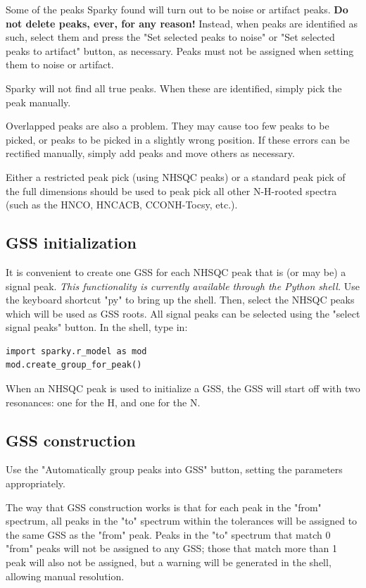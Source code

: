 Some of the peaks Sparky found will turn out to be noise or artifact peaks.
\textbf{Do not delete peaks, ever, for any reason!}  Instead,
when peaks are identified as such, select them and press the "Set selected 
peaks to noise" or "Set selected peaks to artifact" button, as necessary.
Peaks must not be assigned when setting them to noise or artifact.

Sparky will not find all true peaks.  When these are identified, simply
pick the peak manually.

Overlapped peaks are also a problem.  They may cause too few peaks to be 
picked, or peaks to be picked in a slightly wrong position.  If these errors
can be rectified manually, simply add peaks and move others as necessary.

Either a restricted peak pick (using NHSQC peaks) or a standard peak pick
of the full dimensions should be used to peak pick all other N-H-rooted
spectra (such as the HNCO, HNCACB, CCONH-Tocsy, etc.).

\subsection{GSS initialization}
It is convenient to create one GSS for each NHSQC peak that is (or may be)
a signal peak.  \textit{This functionality is currently available through
the Python shell.}  Use the keyboard shortcut "py" to bring up the shell.
Then, select the NHSQC peaks which will be used as GSS roots.  
All signal peaks can be selected using the "select signal peaks" button.
In the shell, type in:
\begin{verbatim}
import sparky.r_model as mod
mod.create_group_for_peak()
\end{verbatim}

When an NHSQC peak is used to initialize a GSS, the GSS will start off
with two resonances: one for the H, and one for the N.

\subsection{GSS construction}
Use the "Automatically group peaks into GSS" button, setting the parameters
appropriately.

The way that GSS construction works is that for each peak in the "from"
spectrum, all peaks in the "to" spectrum within the tolerances will be
assigned to the same GSS as the "from" peak.  Peaks in the "to" spectrum that
match 0 "from" peaks will not be assigned to any GSS; those that match more
than 1 peak will also not be assigned, but a warning will be generated in
the shell, allowing manual resolution.

